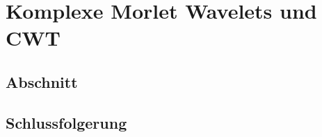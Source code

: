 %
%
%
\chapter{Komplexe Morlet Wavelets und CWT\label{chapter:thema}}
\begin{refsection}

\section{Abschnitt}

\section{Schlussfolgerung}

\printbibliography[heading=subbibliography]
\end{refsection}
